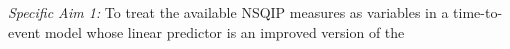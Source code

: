 \emph{Specific Aim 1:} To treat the available NSQIP measures as variables in a time-to-event model whose linear predictor is an improved version of the 